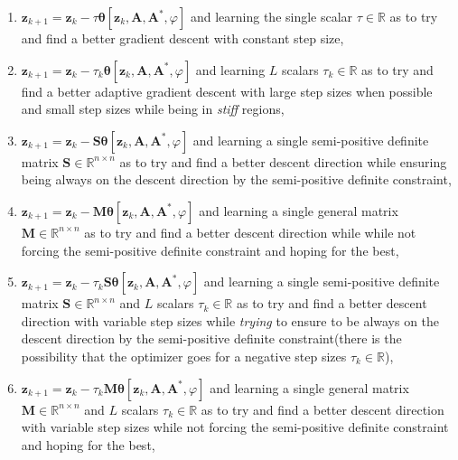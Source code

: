 \begin{enumerate}
  \item $\boldsymbol{z}_{k+1} = \boldsymbol{z}_k - \tau\boldsymbol{\theta}[\boldsymbol{z}_k,\boldsymbol{A},\boldsymbol{A^*},\varphi]$ 
  and learning the single scalar $\tau \in \mathbb{R}$ as to try and find a better gradient descent with constant step size,
  \item $\boldsymbol{z}_{k+1} = \boldsymbol{z}_k - \tau_k\boldsymbol{\theta}[\boldsymbol{z}_k,\boldsymbol{A},\boldsymbol{A^*},\varphi]$
  and learning $L$ scalars $\tau_k\in\mathbb{R}$ as to try and find a better adaptive gradient descent with large step sizes when possible 
  and small step sizes while being in \emph{stiff} regions, 
  \item $\boldsymbol{z}_{k+1} = \boldsymbol{z}_k - \boldsymbol{S}\boldsymbol{\theta}[\boldsymbol{z}_k,\boldsymbol{A},\boldsymbol{A^*},\varphi]$
  and learning a single semi-positive definite matrix $\boldsymbol{S}\in \mathbb{R}^{n\times n}$ as to try and find a better descent direction while 
  ensuring being always on the descent direction by the semi-positive definite constraint,
  \item $\boldsymbol{z}_{k+1} = \boldsymbol{z}_k - \boldsymbol{M}\boldsymbol{\theta}[\boldsymbol{z}_k,\boldsymbol{A},\boldsymbol{A^*},\varphi]$
  and learning a single general matrix $\boldsymbol{M}\in \mathbb{R}^{n\times n}$ as to try and find a better descent direction while 
  while not forcing the semi-positive definite constraint and hoping for the best,
  \item $\boldsymbol{z}_{k+1} = \boldsymbol{z}_k - \tau_k\boldsymbol{S}\boldsymbol{\theta}[\boldsymbol{z}_k,\boldsymbol{A},\boldsymbol{A^*},\varphi]$
  and learning a single semi-positive definite matrix $\boldsymbol{S}\in \mathbb{R}^{n\times n}$ and $L$ scalars $\tau_k \in \mathbb{R}$ as to try and find a 
  better descent direction with variable step sizes while \emph{trying} to ensure to be always on the descent direction by the semi-positive definite constraint(there is
  the possibility that the optimizer goes for a negative step sizes $\tau_k \in \mathbb{R}$), 
  \item $\boldsymbol{z}_{k+1} = \boldsymbol{z}_k - \tau_k\boldsymbol{M}\boldsymbol{\theta}[\boldsymbol{z}_k,\boldsymbol{A},\boldsymbol{A^*},\varphi]$
  and learning a single general matrix $\boldsymbol{M}\in \mathbb{R}^{n\times n}$ and $L$ scalars $\tau_k \in \mathbb{R}$ as to try and find a 
  better descent direction with variable step sizes while not forcing the semi-positive definite constraint and hoping for the best,

\end{enumerate}
